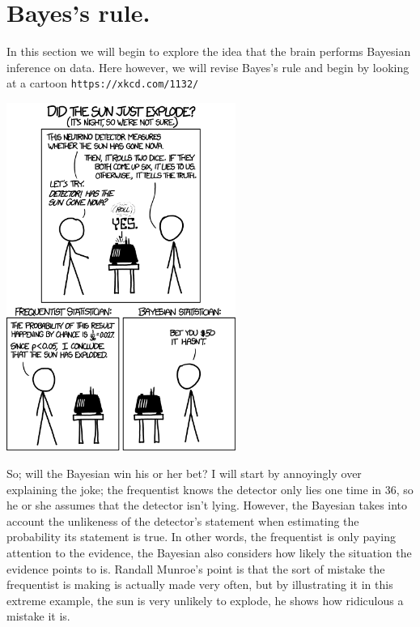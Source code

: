 \documentclass[12pt]{article}
\begin{document}
\section*{Bayes's rule.}

In this section we will begin to explore the idea that the brain
performs Bayesian inference on data. Here however, we will revise
Bayes's rule and begin by looking at a cartoon
\texttt{https://xkcd.com/1132/}

\begin{center}
\includegraphics[width=7.5cm]{frequentists_vs_bayesians.png}
\end{center}

So; will the Bayesian win his or her bet? I will start by annoyingly
over explaining the joke; the frequentist knows the detector only lies
one time in 36, so he or she assumes that the detector isn't
lying. However, the Bayesian takes into account the unlikeness of
the detector's statement when estimating the probability its
statement is true. In other words, the frequentist is only paying
attention to the evidence, the Bayesian also considers how likely the
situation the evidence points to is. Randall Munroe's point is that
the sort of mistake the frequentist is making is actually made very
often, but by illustrating it in this extreme example, the sun is very
unlikely to explode, he shows how ridiculous a mistake it is. 
\end{document}
